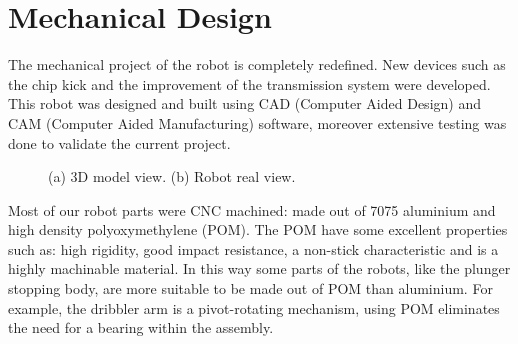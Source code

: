\section{Mechanical Design}\label{mec_sec}

The mechanical project of the robot is completely redefined. New devices such as the chip kick and the improvement of the transmission system were developed. This robot was designed and built using CAD (Computer Aided Design) and CAM (Computer Aided Manufacturing) software, moreover extensive testing was done to validate the current project.

\begin{figure}[thpb]
	\centering
	\caption{(a) 3D model view. (b) Robot real view.}
	\label{mec1}
\end{figure}

Most of our robot parts were CNC machined: made out of 7075 aluminium and high density polyoxymethylene (POM). The POM have some excellent properties such as: high rigidity, good impact resistance,
a non-stick characteristic and is a highly machinable material. In this way some parts of the robots, like the plunger stopping body, are more suitable to be made out of POM than aluminium. For example, the dribbler arm is a pivot-rotating mechanism, using POM eliminates the need for a bearing within the assembly.

